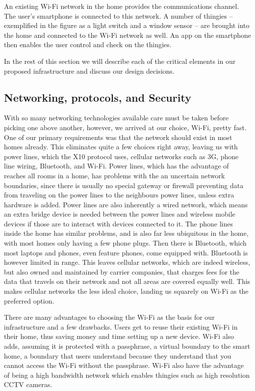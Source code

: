 \documentclass{ubicomp2012}
\begin{document}
An existing Wi-Fi network in the home provides the communications channel. The user's smartphone is connected to this network. A number of thingies -- exemplified in the figure as a light switch and a window sensor -- are brought into the home and connected to the Wi-Fi network as well. An app on the smartphone then enables the user control and check on the thingies.

In the rest of this section we will describe each of the critical elements in our proposed infrastructure and discuss our design decisions.

\subsection{Networking, protocols, and Security}

With so many networking technologies available care must be taken before picking one above another, however, we arrived at our choice, Wi-Fi, pretty fast. One of our primary requirements was that the network should exist in most homes already. This eliminates quite a few choices right away, leaving us with power lines, which the X10 protocol uses, cellular networks such as 3G, phone line wiring, Bluetooth, and Wi-Fi. Power lines, which has the advantage of reaches all rooms in a home, has problems with the an uncertain network boundaries, since there is usually no special gateway or firewall preventing data from traveling on the power lines to the neighbours power lines, unless extra hardware is added. Power lines are also inherently a wired network, which means an extra bridge device is needed between the power lines and wireless mobile devices if those are to interact with devices connected to it. The phone lines inside the home has similar problems, and is also far less ubiquitous in the home, with most homes only having a few phone plugs. Then there is Bluetooth, which most laptops and phones, even feature phones, come equipped with. Bluetooth is however limited in range. This leaves cellular networks, which are indeed wireless, but also owned and maintained by carrier companies, that charges fees for the data that travels on their network and not all areas are covered equally well. This makes cellular networks the less ideal choice, landing us squarely on Wi-Fi as the preferred option.

There are many advantages to choosing the Wi-Fi as the basis for our infrastructure and a few drawbacks. Users get to reuse their existing Wi-Fi in their home, thus saving money and time setting up a new device. Wi-Fi also adds, assuming it is protected with a passphrase, a virtual boundary to the smart home, a boundary that users understand because they understand that you cannot access the Wi-Fi without the passphrase. Wi-Fi also have the advantage of being a high bandwidth network which enables thingies such as high resolution CCTV cameras.
\end{document}
